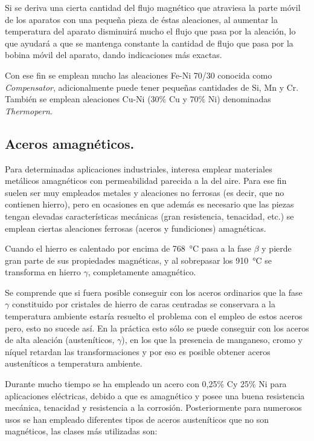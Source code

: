 \documentclass[12pt,a4paper]{article}
\begin{document}
Si se deriva una cierta cantidad del flujo magnético que atraviesa la parte móvil de los aparatos con una pequeña pieza de éstas aleaciones, al aumentar la temperatura del aparato disminuirá mucho el flujo que pasa por la aleación, lo que ayudará a que se mantenga constante la cantidad de flujo que pasa por la bobina móvil del aparato, dando indicaciones más exactas.

Con ese fin se emplean mucho las aleaciones Fe-Ni 70/30 conocida como \textit{Compensator}, adicionalmente puede tener pequeñas cantidades de Si, Mn y Cr. También se emplean aleaciones Cu-Ni (30\% Cu y 70\% Ni) denominadas \textit{Thermopern}.

\subsection{Aceros amagnéticos.}

Para determinadas aplicaciones industriales, interesa emplear materiales metálicos amagnéticos con permeabilidad parecida a la del aire. Para ese fin suelen ser muy empleados metales y aleaciones no ferrosas (es decir, que no contienen hierro), pero en ocasiones en que además es necesario que las piezas tengan elevadas características mecánicas (gran resistencia, tenacidad, etc.) se emplean ciertas aleaciones ferrosas (aceros y fundiciones) amagnéticas.

Cuando el hierro es calentado por encima de \SI{768}{\celsius} pasa a la fase $\beta$ y pierde gran parte de sus propiedades magnéticas, y al sobrepasar los \SI{910}{\celsius} se transforma en hierro $\gamma$, completamente amagnético.

Se comprende que si fuera posible conseguir con los aceros ordinarios que la fase $\gamma$ constituido por cristales de hierro de caras centradas se conservara a la temperatura ambiente estaría resuelto el problema con el empleo de estos aceros pero, esto no sucede así. En la práctica esto sólo se puede conseguir con los aceros de alta aleación (austeníticos, $\gamma$), en los que la presencia de manganeso, cromo y níquel retardan las transformaciones y por eso es posible obtener aceros austeníticos a temperatura ambiente.

Durante mucho tiempo se ha empleado un acero con 0,25\% Cy 25\% Ni para aplicaciones eléctricas, debido a que es amagnético y posee una buena resistencia mecánica, tenacidad y resistencia a la corrosión. Posteriormente para numerosos usos se han empleado diferentes tipos de aceros austeníticos que no son magnéticos, las clases más utilizadas son: 
\end{document}
